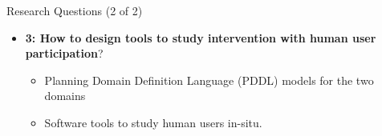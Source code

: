 \begin{frame}{Research Questions (2 of 2)}
\begin{itemize}
\item \textbf{3: How to design tools to study intervention with human user participation}?
\begin{itemize}
\item Planning Domain Definition Language (PDDL) models for the two domains
\item Software tools to study human users in-situ.
\end{itemize}
\end{itemize}
\end{frame}